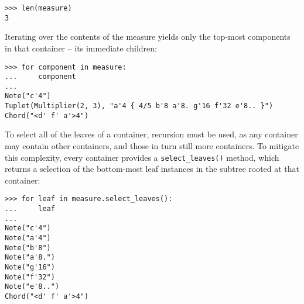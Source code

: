 \begin{comment}
<abjad>
len(measure)
</abjad>
\end{comment}

\begin{abjadbookoutput}
\begin{singlespacing}
\vspace{-0.5\baselineskip}
\begin{verbatim}
>>> len(measure)
3
\end{verbatim}
\end{singlespacing}
\end{abjadbookoutput}

\noindent Iterating over the contents of the  measure yields only
the top-most components in that container -- its immediate children:

\begin{comment}
<abjad>
for component in measure:
    component

</abjad>
\end{comment}

\begin{abjadbookoutput}
\begin{singlespacing}
\vspace{-0.5\baselineskip}
\begin{verbatim}
>>> for component in measure:
...     component
...
Note("c'4")
Tuplet(Multiplier(2, 3), "a'4 { 4/5 b'8 a'8. g'16 f'32 e'8.. }")
Chord("<d' f' a'>4")
\end{verbatim}
\end{singlespacing}
\end{abjadbookoutput}

\noindent To select all of the leaves of a container, recursion must be used,
as any container may contain other containers, and those in turn still more
containers. To mitigate this complexity, every container provides a
\texttt{select\_leaves()} method, which returns a selection of the bottom-most
leaf instances in the subtree rooted at that container:

\begin{comment}
<abjad>
for leaf in measure.select_leaves():
    leaf

</abjad>
\end{comment}

\begin{abjadbookoutput}
\begin{singlespacing}
\vspace{-0.5\baselineskip}
\begin{verbatim}
>>> for leaf in measure.select_leaves():
...     leaf
...
Note("c'4")
Note("a'4")
Note("b'8")
Note("a'8.")
Note("g'16")
Note("f'32")
Note("e'8..")
Chord("<d' f' a'>4")
\end{verbatim}
\end{singlespacing}
\end{abjadbookoutput}

